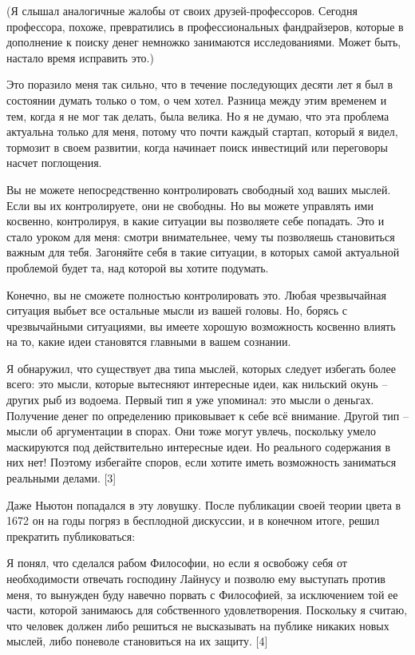 \documentclass[ebook,12pt,oneside,openany]{memoir}
\begin{document}
(Я слышал аналогичные жалобы от своих друзей-профессоров. Сегодня
профессора, похоже, превратились в профессиональных фандрайзеров,
которые в дополнение к поиску денег немножко занимаются
исследованиями. Может быть, настало время исправить это.)

Это поразило меня так сильно, что в течение последующих десяти лет я
был в состоянии думать только о том, о чем хотел. Разница между этим
временем и тем, когда я не мог так делать, была велика. Но я не думаю,
что эта проблема актуальна только для меня, потому что почти каждый
стартап, который я видел, тормозит в своем развитии, когда начинает
поиск инвестиций или переговоры насчет поглощения.

Вы не можете непосредственно контролировать свободный ход ваших
мыслей. Если вы их контролируете, они не свободны. Но вы можете
управлять ими косвенно, контролируя, в какие ситуации вы позволяете
себе попадать. Это и стало уроком для меня: смотри внимательнее, чему
ты позволяешь становиться важным для тебя. Загоняйте себя в такие
ситуации, в которых самой актуальной проблемой будет та, над которой
вы хотите подумать.

Конечно, вы не сможете полностью контролировать это. Любая
чрезвычайная ситуация выбьет все остальные мысли из вашей головы. Но,
борясь с чрезвычайными ситуациями, вы имеете хорошую возможность
косвенно влиять на то, какие идеи становятся главными в вашем
сознании.

Я обнаружил, что существует два типа мыслей, которых следует избегать
более всего: это мысли, которые вытесняют интересные идеи, как
нильский окунь – других рыб из водоема. Первый тип я уже упоминал: это
мысли о деньгах. Получение денег по определению приковывает к себе всё
внимание. Другой тип – мысли об аргументации в спорах. Они тоже могут
увлечь, поскольку умело маскируются под действительно интересные идеи.
Но реального содержания в них нет! Поэтому избегайте споров, если
хотите иметь возможность заниматься реальными делами. [3]

Даже Ньютон попадался в эту ловушку. После публикации своей теории
цвета в 1672 он на годы погряз в бесплодной дискуссии, и в конечном
итоге, решил прекратить публиковаться:

Я понял, что сделался рабом Философии, но если я освобожу себя от
необходимости отвечать господину Лайнусу и позволю ему выступать
против меня, то вынужден буду навечно порвать с Философией, за
исключением той ее части, которой занимаюсь для собственного
удовлетворения. Поскольку я считаю, что человек должен либо решиться
не высказывать на публике никаких новых мыслей, либо поневоле
становиться на их защиту. [4]
\end{document}
